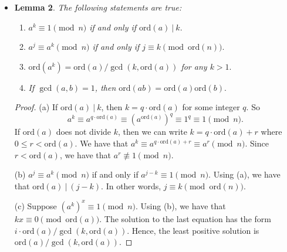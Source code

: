 \documentclass{article}
\newtheorem{lemma}{Lemma}[section]
\newtheorem{definition}[lemma]{Definition}
\newcommand{\divides}{\ |\ }
\newcommand{\ord}{\mathrm{ord}}
\begin{document}
\begin{itemize}
        \begin{definition}
          Let $n$ be a positive integer and let $\gcd(a,n) = 1$. 
          The \emph{order of $a$ modulo $n$} is
          the smallest positive integer $k$ such that $a^k \equiv 1 \pmod{n}.$ We denote
          the order of $a$ by $\ord_n(a)$ or $\ord(a)$ when it is clear what $n$ is.
        \end{definition}
        
        Note that $g$ is a primitive root if and only if $\ord(g) = \phi(n).$
        
      \item 
        \begin{lemma} The following statements are true:
          \renewcommand{\labelenumi}{(\alph{enumi})}
          \begin{enumerate}
            \item $a^k \equiv 1 \pmod{n}$ if and only if $\ord(a)\ |\ k.$
            \item $a^j \equiv a^k \pmod{n}$ if and only if $j \equiv k \pmod{\ord(n)}.$ 
            \item $\ord(a^k) = \ord(a) / \gcd(k, \ord(a))$ for any $k > 1.$
            \item If $\gcd(a, b) = 1$, then $\ord(ab) = \ord(a) \ord(b).$
          \end{enumerate}
        \end{lemma}
        \begin{proof}
          (a) If $\ord(a) \divides k$, then $k = q \cdot \ord(a)$ for some integer $q$.
            So $$a^k \equiv a^{q \cdot \ord(a)} \equiv (a^{\ord(a)})^q \equiv 1^q \equiv 1 \pmod{n}.$$
            If $\ord(a)$ does not divide $k$, then we can write $k = q \cdot \ord(a) + r$
            where $0 \leq r < \ord(a).$ We have that
            $a^k \equiv a^{q \cdot \ord(a) + r} \equiv a^r \pmod{n}.$
            Since $r < \ord(a)$, we have that $a^r \not\equiv 1 \pmod{n}.$
            \medskip
            
          (b) $a^j \equiv a^k \pmod{n}$ if and only if $a^{j-k} \equiv 1 \pmod{n}.$
            Using (a), we have that $\ord(a) \divides (j-k)$. In other words,
            $j \equiv k \pmod{\ord(n)}.$ \medskip
            
          (c) Suppose $(a^{k})^x \equiv 1 \pmod{n}$. Using (b), we have that $kx \equiv 0 \pmod{\ord(a)}$.
            The solution to the last equation has the form $i \cdot \ord(a) / \gcd(k, \ord(a))$. Hence, the
            least positive solution is $\ord(a) / \gcd(k, \ord(a))$.
        \end{proof}
    \end{itemize}
\end{document}
